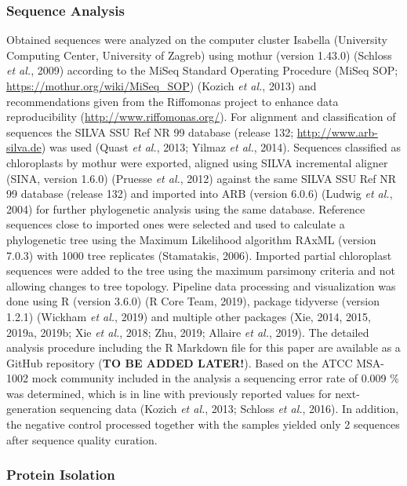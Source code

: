 \documentclass[12pt,]{article}
\begin{document}
\subsubsection{Sequence Analysis}\label{sequence-analysis}

Obtained sequences were analyzed on the computer cluster Isabella
(University Computing Center, University of Zagreb) using mothur
(version 1.43.0) (Schloss \emph{et al.}, 2009) according to the MiSeq
Standard Operating Procedure (MiSeq SOP;
\url{https://mothur.org/wiki/MiSeq_SOP}) (Kozich \emph{et al.}, 2013)
and recommendations given from the Riffomonas project to enhance data
reproducibility (\url{http://www.riffomonas.org/}). For alignment and
classification of sequences the SILVA SSU Ref NR 99 database (release
132; \url{http://www.arb-silva.de}) was used (Quast \emph{et al.}, 2013;
Yilmaz \emph{et al.}, 2014). Sequences classified as chloroplasts by
mothur were exported, aligned using SILVA incremental aligner (SINA,
version 1.6.0) (Pruesse \emph{et al.}, 2012) against the same SILVA SSU
Ref NR 99 database (release 132) and imported into ARB (version 6.0.6)
(Ludwig \emph{et al.}, 2004) for further phylogenetic analysis using the
same database. Reference sequences close to imported ones were selected
and used to calculate a phylogenetic tree using the Maximum Likelihood
algorithm RAxML (version 7.0.3) with 1000 tree replicates (Stamatakis,
2006). Imported partial chloroplast sequences were added to the tree
using the maximum parsimony criteria and not allowing changes to tree
topology. Pipeline data processing and visualization was done using R
(version 3.6.0) (R Core Team, 2019), package tidyverse (version 1.2.1)
(Wickham \emph{et al.}, 2019) and multiple other packages (Xie, 2014,
2015, 2019a, 2019b; Xie \emph{et al.}, 2018; Zhu, 2019; Allaire \emph{et
al.}, 2019). The detailed analysis procedure including the R Markdown
file for this paper are available as a GitHub repository (\textbf{TO BE
ADDED LATER!}). Based on the ATCC MSA-1002 mock community included in
the analysis a sequencing error rate of 0.009 \si{\percent} was
determined, which is in line with previously reported values for
next-generation sequencing data (Kozich \emph{et al.}, 2013; Schloss
\emph{et al.}, 2016). In addition, the negative control processed
together with the samples yielded only 2 sequences after sequence
quality curation.

\subsubsection{Protein Isolation}\label{protein-isolation}
\end{document}
